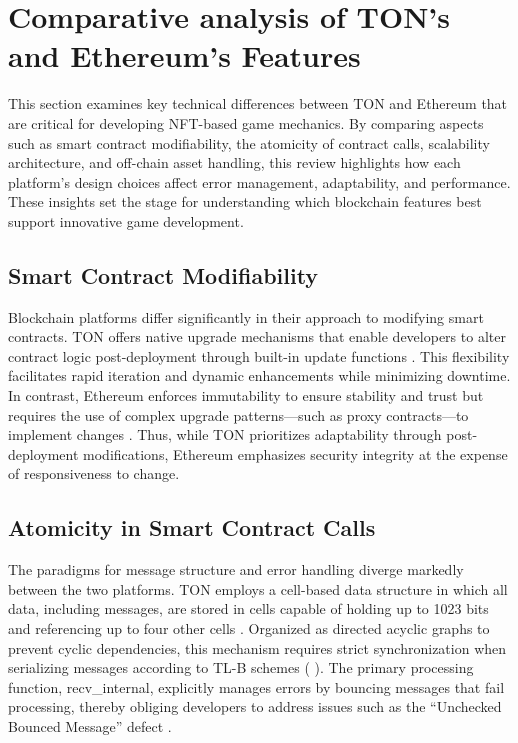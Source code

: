 \section{Comparative analysis of TON's and Ethereum's Features}

This section examines key technical differences between TON and Ethereum that
are critical for developing NFT-based game mechanics. By comparing aspects such
as smart contract modifiability, the atomicity of contract calls, scalability
architecture, and off-chain asset handling, this review highlights how each
platform’s design choices affect error management, adaptability, and
performance. These insights set the stage for understanding which blockchain
features best support innovative game development.

\subsection{Smart Contract Modifiability}

Blockchain platforms differ significantly in their approach to modifying smart
contracts. TON offers native upgrade mechanisms that enable developers to alter
contract logic post-deployment through built-in update functions
\cite{songEnhancingOpenNetwork2025}. This flexibility facilitates rapid
iteration and dynamic enhancements while minimizing downtime. In contrast,
Ethereum enforces immutability to ensure stability and trust but requires the
use of complex upgrade patterns—such as proxy contracts—to implement changes
\cite{pathakInteroperabilityLegalInterpretation2024,
	caiDecentralizedApplicationsBlockchainEmpowered2018}. Thus, while TON
prioritizes adaptability through post-deployment modifications, Ethereum
emphasizes security integrity at the expense of responsiveness to change.

\subsection{Atomicity in Smart Contract Calls}

The paradigms for message structure and error handling diverge markedly between
the two platforms. TON employs a cell-based data structure in which all data,
including messages, are stored in cells capable of holding up to 1023 bits and
referencing up to four other cells  \cite{durovTelegramOpenNetwork2020}.
Organized as directed acyclic graphs to prevent cyclic dependencies, this
mechanism requires strict synchronization when serializing messages according to
TL-B schemes ( \cite{durovTelegramOpenNetwork2020} ). The primary processing
function, recv\_internal, explicitly manages errors by bouncing messages that
fail processing, thereby obliging developers to address issues such as the
“Unchecked Bounced Message” defect \cite{songEnhancingOpenNetwork2025}.

